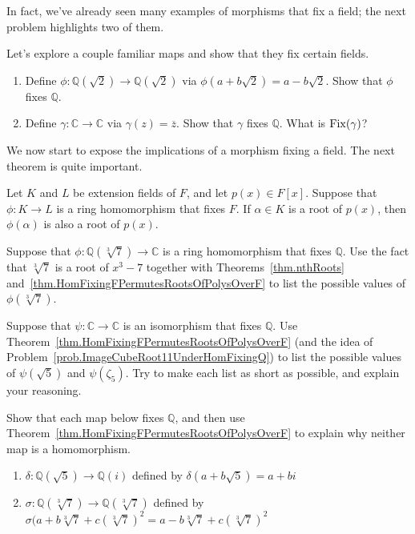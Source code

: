 In fact, we've already seen many examples of morphisms that fix a field; the next problem highlights two of them.

\begin{problem}
Let's explore a couple familiar maps and show that they fix certain fields.
\begin{enumerate}
\item Define $\phi:\mathbb{Q}(\sqrt{2})\rightarrow\mathbb{Q}(\sqrt{2})$ via $\phi(a+b\sqrt{2}) = a-b\sqrt{2}$. Show that $\phi$ fixes  $\mathbb{Q}$.
\item Define $\gamma:\mathbb{C}\rightarrow\mathbb{C}$ via $\gamma(z) = \overline{z}$. Show that $\gamma$ fixes  $\mathbb{Q}$. What is $\operatorname{Fix}(\gamma)$?
\end{enumerate}
\end{problem}

We now start to expose the implications of a morphism fixing a field. The next theorem is quite important.

\begin{theorem}\label{thm.HomFixingFPermutesRootsOfPolysOverF}
Let $K$ and $L$ be extension fields of $F$, and let $p(x)\in F[x]$. Suppose that $\phi:K\to L$ is a ring homomorphism that fixes $F$. If $\alpha\in K$ is a root of $p(x)$, then $\phi(\alpha)$ is also a root of $p(x)$. 
\end{theorem}

\begin{problem}\label{prob.ImageCubeRoot11UnderHomFixingQ}
Suppose that $\phi:\mathbb{Q}(\sqrt[3]{7})\rightarrow\mathbb{C}$ is a ring homomorphism that fixes $\mathbb{Q}$. Use the fact that $\sqrt[3]{7}$ is a root of $x^3 - 7$ together with Theorems~\ref{thm.nthRoots} and~\ref{thm.HomFixingFPermutesRootsOfPolysOverF} to list the possible values of $\phi(\sqrt[3]{7})$.
\end{problem}	

\begin{problem}
Suppose that $\psi:\mathbb{C}\to \mathbb{C}$ is an isomorphism that fixes $\mathbb{Q}$. Use Theorem~\ref{thm.HomFixingFPermutesRootsOfPolysOverF} (and the idea of Problem~\ref{prob.ImageCubeRoot11UnderHomFixingQ}) to list the possible values of $\psi(\sqrt{5})$ and $\psi(\zeta_5)$. Try to make each list as short as possible, and explain your reasoning.
\end{problem}

\begin{problem}
Show that each map below fixes $\mathbb{Q}$, and then use Theorem~\ref{thm.HomFixingFPermutesRootsOfPolysOverF} to explain why neither map is a homomorphism.
\begin{enumerate}
\item $\delta:\mathbb{Q}(\sqrt{5})\rightarrow\mathbb{Q}(i)$ defined by $\delta(a+b\sqrt{5}) = a+ b i$
\item $\sigma:\mathbb{Q}(\sqrt[3]{7})\rightarrow\mathbb{Q}(\sqrt[3]{7})$ defined by $\sigma(a+b\sqrt[3]{7} + c (\sqrt[3]{7})^2 = a-b\sqrt[3]{7} + c (\sqrt[3]{7})^2$
\end{enumerate}
\end{problem}

